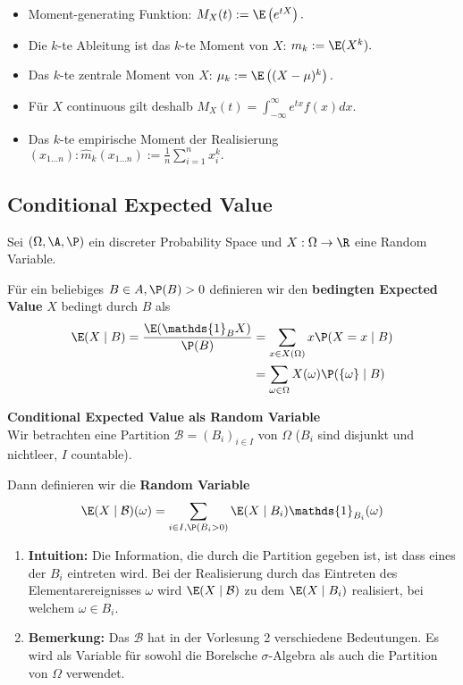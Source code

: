 \begin{subbox}{}
    \begin{itemize}
        \item Moment-generating Funktion: $M_X(t):=\E\left(e^{tX}\right).$ 
        \item Die $k$-te Ableitung ist das $k$-te Moment von $X$: $m_k := \E(X^k).$ 
        \item Das $k$-te zentrale Moment von $X$: $\mu_k := \E\left((X-\mu)^k\right).$ 
        \item Für $X$ continuous gilt deshalb $M_X(t) = \int_{-\infty}^\infty e^{tx} f(x) dx.$ 
        \item Das $k$-te empirische Moment der Realisierung $(x_{1\dots n}): \hat m_k(x_{1\dots n}) := \frac1n \sum_{i=1}^n x_i^k.$ 
    \end{itemize}
    
\end{subbox}

\subsection{Conditional Expected Value}
Sei $(\Omega, \A, \P)$ ein discreter Probability Space und $X:\Omega \to \R$ eine Random Variable. 

Für ein beliebiges $B \in A, \P(B) > 0$ definieren wir den \textbf{bedingten Expected Value} $X$ bedingt durch $B$ als
\begin{align*}
    \E(X \mid B) = \frac{\E(\mathds{1}_B X)}{\P(B)} &= \sum_{x \in X(\Omega)}x\P(X = x\mid B)\\ 
    &= \sum_{\omega \in \Omega}X(\omega)\P(\{\omega\}\mid B)
\end{align*}

\textbf{Conditional Expected Value als Random Variable}\\
Wir betrachten eine Partition $\mathcal{B} = (B_i)_{i \in I}$ von $\Omega$ ($B_i$ sind disjunkt und nichtleer, $I$ countable). 

Dann definieren wir die \textbf{Random Variable}
$$\E(X \mid \mathcal{B})(\omega) = \sum_{i \in I, \P(B_i > 0)} \E(X \mid B_i) \mathds{1}_{B_i}(\omega)$$ 
\begin{enumerate}
    \item \textbf{Intuition:} Die Information, die durch die Partition gegeben ist, ist dass eines der $B_i$ eintreten wird. Bei der Realisierung durch das Eintreten des Elementarereignisses $\omega$ wird $\E(X \mid \mathcal{B})$ zu dem $\E(X \mid B_i)$ realisiert, bei welchem $\omega \in B_i$.
    \item \textbf{Bemerkung:} Das $\mathcal{B}$ hat in der Vorlesung 2 verschiedene Bedeutungen. Es wird als Variable für sowohl die Borelsche $\sigma$-Algebra als auch die Partition von $\Omega$ verwendet.
\end{enumerate}

